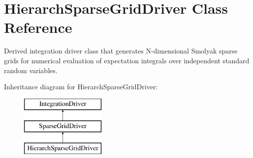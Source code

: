 \section{Hierarch\+Sparse\+Grid\+Driver Class Reference}
\label{classPecos_1_1HierarchSparseGridDriver}


Derived integration driver class that generates N-\/dimensional Smolyak sparse grids for numerical evaluation of expectation integrals over independent standard random variables.  


Inheritance diagram for Hierarch\+Sparse\+Grid\+Driver\+:\begin{figure}[H]
\begin{center}
\leavevmode
\includegraphics[height=3.000000cm]{classPecos_1_1HierarchSparseGridDriver}
\end{center}
\end{figure}
